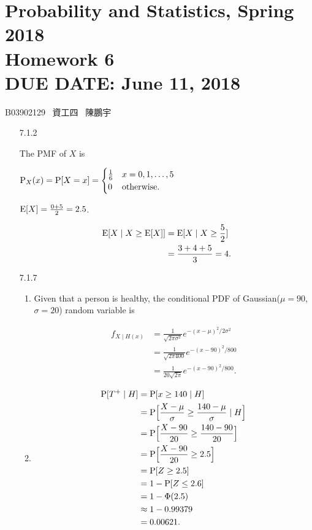 \documentclass{article}
\newcommand{\hmwkClass}{Probability and Statistics, Spring 2018}
\newcommand{\hmwkTitle}{Homework 6}
\newcommand{\hmwkDueDate}{June 11, 2018}
\begin{document}
\thispagestyle{empty}
\section*{\hmwkClass \\
    \normalsize{\hmwkTitle} \\
    \normalsize{DUE DATE: \hmwkDueDate}
}

\hfill{B03902129 \, 資工四 \, 陳鵬宇}

\begin{enumerate}
    \item [7.1.2]

    The PMF of $X$ is

    $\text P_X(x) = \text P[X = x] = \begin{cases}
        \frac{1}{6} & x = 0, 1, \dots, 5 \\
        0           & \text{otherwise}.
    \end{cases}
    $

    $\text E[X] = \frac{0 + 5}{2} = 2.5$.

    \begin{align*}
        \text E[X \mid X \ge \text E[X]]
        & = \text E[X \mid X \ge \frac{5}{2}] \\
        & = \frac{3 + 4 + 5}{3} = 4.
    \end{align*}    

    \item [7.1.7]

    \begin{enumerate}[label=(\alph*)]
        \item Given that a person is healthy, the conditional PDF of Gaussian($\mu = 90$, $\sigma = 20$) random variable is

        \begin{align*}
            f_{X \mid H(x)}
            & = \frac{1}{\sqrt{2\pi\sigma^2}} e^{-(x - \mu)^2 / 2\sigma^2} \\
            & = \frac{1}{\sqrt{2\pi 400}} e^{-(x - 90)^2 / 800} \\
            & = \frac{1}{20\sqrt{2\pi}} e^{-(x - 90)^2 / 800}.
        \end{align*}

        \item 

        \begin{align*}
            \text P[T^+ \mid H]
            & = \text P[x \ge 140 \mid H] \\
            & = \text P \Big[\frac{X - \mu}{\sigma} \ge \frac{140 - \mu}{\sigma} \mid H \Big] \\
            & = \text P \Big[\frac{X - 90}{20} \ge \frac{140 - 90}{20} \Big] \\
            & = \text P \Big[\frac{X - 90}{20} \ge 2.5 \Big] \\
            & = \text P[Z \ge 2.5] \\
            & = 1 - \text P[Z \le 2.6] \\
            & = 1 - \Phi(2.5) \\
            & \approx 1 - 0.99379 \\
            & = 0.00621.
        \end{align*}


\end{enumerate}
\end{enumerate}
\end{document}
